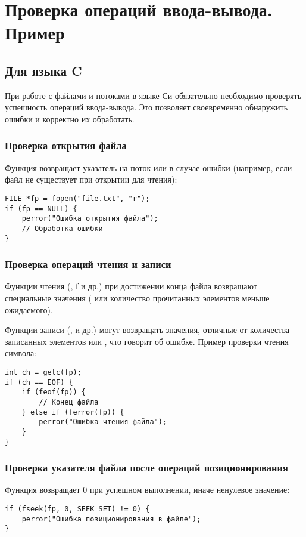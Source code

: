 \section{Проверка операций ввода-вывода. Пример}
\subsection{Для языка C}
При работе с файлами и потоками в языке Си обязательно необходимо проверять успешность операций ввода-вывода. Это позволяет своевременно
обнаружить ошибки и корректно их обработать.

\subsubsection{Проверка открытия файла}
Функция  возвращает указатель на поток или  в случае ошибки (например, если файл не существует при открытии для чтения):

\begin{verbatim}
FILE *fp = fopen("file.txt", "r");
if (fp == NULL) {
    perror("Ошибка открытия файла");
    // Обработка ошибки
}
\end{verbatim}

\subsubsection{Проверка операций чтения и записи}
Функции чтения (, f и др.) при достижении конца файла возвращают специальные значения (
или количество прочитанных элементов меньше ожидаемого).

Функции записи (,  и др.) могут возвращать значения, отличные от количества записанных элементов или , что говорит об ошибке.
Пример проверки чтения символа:

\begin{verbatim}
int ch = getc(fp);
if (ch == EOF) {
    if (feof(fp)) {
        // Конец файла
    } else if (ferror(fp)) {
        perror("Ошибка чтения файла");
    }
}
\end{verbatim}

\subsubsection{Проверка указателя файла после операций позиционирования}
Функция  возвращает 0 при успешном выполнении, иначе ненулевое значение:
\begin{verbatim}
if (fseek(fp, 0, SEEK_SET) != 0) {
    perror("Ошибка позиционирования в файле");
}
\end{verbatim}

